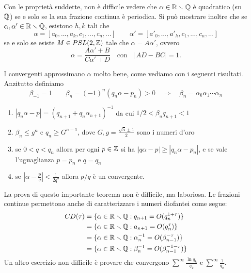 \begin{esempio}
 Con le proprietà suddette, non è difficile vedere che $\alpha\in\irr$ è quadratico (su $\mathbb{Q}$) se e solo se la sua frazione continua è periodica. Si può mostrare inoltre che se $\alpha,\alpha'\in\mathbb{R}\smallsetminus\mathbb{Q}$, esistono $h,k$ tali che
 \[\alpha=[a_0,\dots,a_k,c_1,\dots,c_n,\dots] \qquad \alpha'=[a'_0,\dots,a'_h,c_1,\dots,c_n,\dots]\]
 se e solo se esiste $M\in PSL(2,\mathbb{Z})$ tale che $\alpha=A\alpha'$, ovvero 
 \[\alpha=\frac{A\alpha'+B}{C\alpha'+D}\quad \mbox{con}\quad |AD-BC|=1.\]
\end{esempio}

I convergenti approssimano $\alpha$ molto bene, come vediamo con i seguenti risultati. Anzitutto definiamo
\[\beta_{-1}=1\qquad \beta_n=(-1)^n(q_n\alpha-p_n)>0 \quad \Rightarrow \quad \beta_n=\alpha_0\alpha_1\cdots \alpha_n\]

\begin{teo}\begin{enumerate} Se $\alpha\in\irr$, valgono
  \item $|q_n\alpha-p|=(q_{n+1}+q_n\alpha_{n+1})^{-1}$ da cui $1/2<\beta_nq_{n+1}<1$
  \item $\beta_n\leq g^n$ e $q_n\geq G^{n-1}$, dove $G,g=\frac{\sqrt 5\pm 1}{2}$ sono i numeri d'oro
  \item se $0<q<q_n$ allora per ogni $p\in\mathbb{Z}$ si ha $|q\alpha-p|\geq |q_n\alpha-p_n|$, e se vale l'uguaglianza $p=p_n$ e $q=q_n$
  \item se $\left|\alpha-\frac{p}{q}\right|<\frac{1}{2q^2}$ allora $p/q$ è un convergente.
  \end{enumerate}\end{teo}

La prova di questo importante teorema non è difficile, ma laboriosa. Le frazioni continue permettono anche di caratterizzare i numeri diofantei come segue:
\[\begin{split} CD(\tau)&=\{\alpha\in\mathbb{R}\smallsetminus\mathbb{Q}:q_{n+1}=O(q_n^{1+\tau})\}\\
			&=\{\alpha\in\mathbb{R}\smallsetminus\mathbb{Q}:a_{n+1}=O(q_n^{\tau})\}\\
			&=\{\alpha\in\mathbb{R}\smallsetminus\mathbb{Q}:\alpha_n^{-1}=O(\beta_{n-1}^{-\tau})\}\\
			&=\{\alpha\in\mathbb{R}\smallsetminus\mathbb{Q}:\beta_n^{-1}=O(\beta_{n-1}^{-1-\tau})\}
\end{split}\]
Un altro esercizio non difficile è provare che convergono $\sum^\infty\frac{\ln q_k}{q_k}$ e $\sum^\infty\frac{1}{q_k}$.